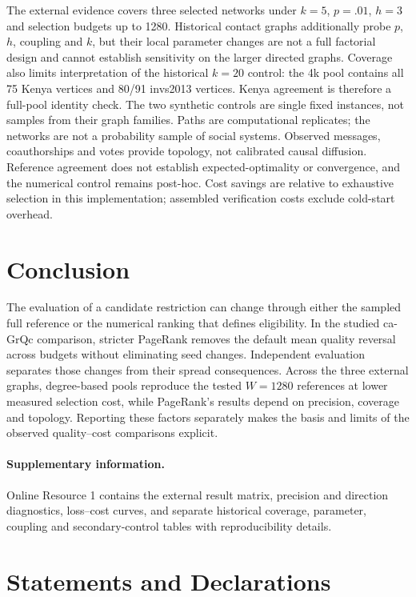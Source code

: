 \documentclass[smallextended]{svjour3}
\begin{document}
The external evidence covers three selected networks under $k=5$, $p=.01$, $h=3$ and selection budgets up to 1280. Historical contact graphs additionally probe $p$, $h$, coupling and $k$, but their local parameter changes are not a full factorial design and cannot establish sensitivity on the larger directed graphs. Coverage also limits interpretation of the historical $k=20$ control: the 4k pool contains all 75 Kenya vertices and 80/91 invs2013 vertices. Kenya agreement is therefore a full-pool identity check. The two synthetic controls are single fixed instances, not samples from their graph families. Paths are computational replicates; the networks are not a probability sample of social systems. Observed messages, coauthorships and votes provide topology, not calibrated causal diffusion. Reference agreement does not establish expected-optimality or convergence, and the numerical control remains post-hoc. Cost savings are relative to exhaustive selection in this implementation; assembled verification costs exclude cold-start overhead.

\section{Conclusion}
The evaluation of a candidate restriction can change through either the sampled full reference or the numerical ranking that defines eligibility. In the studied ca-GrQc comparison, stricter PageRank removes the default mean quality reversal across budgets without eliminating seed changes. Independent evaluation separates those changes from their spread consequences. Across the three external graphs, degree-based pools reproduce the tested $W=1280$ references at lower measured selection cost, while PageRank's results depend on precision, coverage and topology. Reporting these factors separately makes the basis and limits of the observed quality--cost comparisons explicit.

\paragraph{Supplementary information.} Online Resource 1 contains the external result matrix, precision and direction diagnostics, loss--cost curves, and separate historical coverage, parameter, coupling and secondary-control tables with reproducibility details.
\section*{Statements and Declarations}
\end{document}
